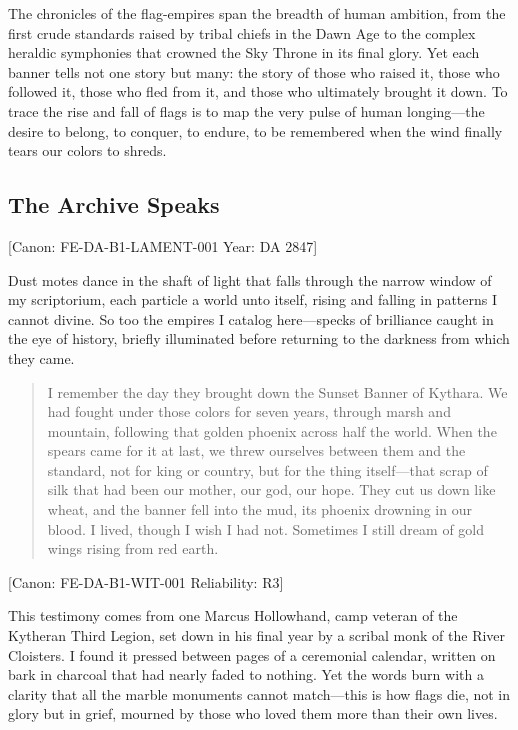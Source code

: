 The chronicles of the flag-empires span the breadth of human ambition,
from the first crude standards raised by tribal chiefs in the Dawn Age
to the complex heraldic symphonies that crowned the Sky Throne in its
final glory. Yet each banner tells not one story but many: the story of
those who raised it, those who followed it, those who fled from it, and
those who ultimately brought it down. To trace the rise and fall of
flags is to map the very pulse of human longing---the desire to belong,
to conquer, to endure, to be remembered when the wind finally tears our
colors to shreds.

\subsection{The Archive Speaks}\label{the-archive-speaks}

{[}Canon: FE-DA-B1-LAMENT-001 \textbar{} Year: DA 2847{]}

Dust motes dance in the shaft of light that falls through the narrow
window of my scriptorium, each particle a world unto itself, rising and
falling in patterns I cannot divine. So too the empires I catalog
here---specks of brilliance caught in the eye of history, briefly
illuminated before returning to the darkness from which they came.

\begin{quote}
I remember the day they brought down the Sunset Banner of Kythara. We
had fought under those colors for seven years, through marsh and
mountain, following that golden phoenix across half the world. When the
spears came for it at last, we threw ourselves between them and the
standard, not for king or country, but for the thing itself---that scrap
of silk that had been our mother, our god, our hope. They cut us down
like wheat, and the banner fell into the mud, its phoenix drowning in
our blood. I lived, though I wish I had not. Sometimes I still dream of
gold wings rising from red earth.
\end{quote}

{[}Canon: FE-DA-B1-WIT-001 \textbar{} Reliability: R3{]}

This testimony comes from one Marcus Hollowhand, camp veteran of the
Kytheran Third Legion, set down in his final year by a scribal monk of
the River Cloisters. I found it pressed between pages of a ceremonial
calendar, written on bark in charcoal that had nearly faded to nothing.
Yet the words burn with a clarity that all the marble monuments cannot
match---this is how flags die, not in glory but in grief, mourned by
those who loved them more than their own lives.


